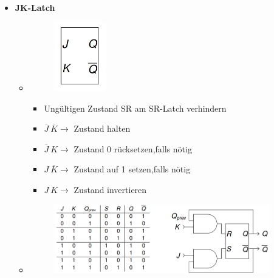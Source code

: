 \documentclass[11pt,a4paper]{article}
\begin{document}
\begin{itemize}
\item \textbf{JK-Latch}
	\begin{itemize}
	\item[]		
				\begin{minipage}{0.25\textwidth}
					\begin{figure}[H]
					\includegraphics[height=3cm]{Bilder/jklatch1}
					\end{figure}
				\end{minipage}
				\begin{minipage}[t]{0.6\textwidth}
					\vspace{-1.25cm}
					\begin{itemize}
					\item Ungültigen Zustand SR am SR-Latch verhindern
					\item $\overline{J}~\overline{K} \rightarrow$ Zustand halten
					\item $\overline{J}~K \rightarrow$ Zustand 0 rücksetzen,falls nötig
					\item $J~\overline{K} \rightarrow$ Zustand auf 1 setzen,falls nötig
					\item $J~K \rightarrow$ Zustand invertieren
					\end{itemize}
				\end{minipage}
				
	\item[] \begin{figure}[H]
				\begin{center}
				\includegraphics[height=3cm]{Bilder/jklatch2}
				\end{center}
			\end{figure}
	\end{itemize}
	

\end{itemize}
\end{document}
